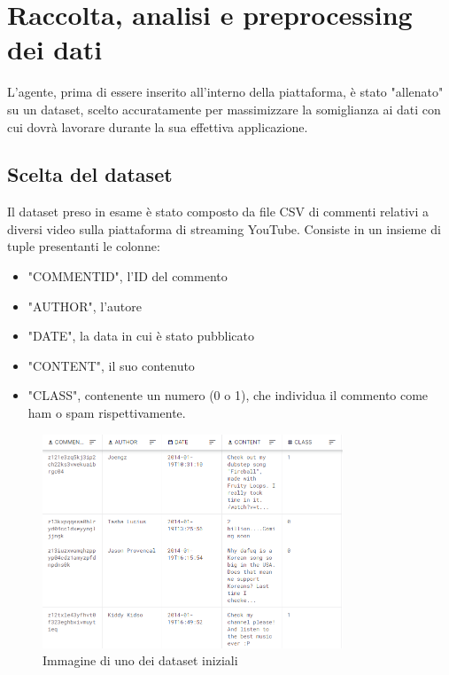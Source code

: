\documentclass{report}
\begin{document}
    

  


   
    \chapter{Raccolta, analisi e preprocessing dei dati}
    L'agente, prima di essere inserito all'interno della piattaforma, è stato "allenato" su un dataset, scelto accuratamente per massimizzare la somiglianza ai dati con cui dovrà lavorare 
    durante la sua effettiva applicazione. 
    \section{Scelta del dataset}
    Il dataset preso in esame è stato composto da file CSV di commenti relativi a diversi video sulla piattaforma di streaming YouTube. 
    Consiste in un insieme di tuple presentanti le colonne:
    \begin{itemize}

        \item "COMMENT\textunderscore ID", l'ID del commento

        \item "AUTHOR", l'autore
        \item "DATE", la data in cui è stato pubblicato
        \item "CONTENT", il suo contenuto
        \item "CLASS", contenente un numero (0 o 1), che individua il commento come ham o spam rispettivamente.
    \end{itemize}

    
    \begin{figure}[h]

        \centering
        \includegraphics[width = 0.8\textwidth]{immagini/datasetExample.png}
        \caption{Immagine di uno dei dataset iniziali}

    \end{figure}
\end{document}
